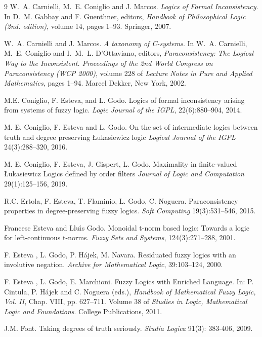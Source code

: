 \documentclass{article}
\theoremstyle{definition}
\begin{document}
\begin{thebibliography}{9}
 W.~A. Carnielli, M.~E. Coniglio and J. Marcos. {\em Logics of Formal Inconsistency}. In D.~M. Gabbay and F. Guenthner, editors, {\em Handbook of Philosophical Logic (2nd. edition)}, volume 14, pages 1--93. Springer, 2007.


W.~A. Carnielli and J. Marcos. {\em A taxonomy of {C}-systems}. In W.~A. Carnielli, M.~E. Coniglio and I.~M.~L. D'Ottaviano, editors,  {\em Paraconsistency: The Logical Way to the Inconsistent.
  Proceedings of the 2nd World Congress on Paraconsistency (WCP 2000)}, volume  228 of {\em Lecture Notes in Pure and Applied Mathematics}, pages 1--94. Marcel Dekker, New York, 2002.

M.E. Coniglio, F. Esteva, and L. Godo. Logics of formal inconsistency arising from systems of fuzzy logic. {\em Logic Journal of the IGPL}, 22(6):880--904, 2014.


  M. E. Coniglio, F. Esteva and L. Godo.
On the set of intermediate logics between truth and degree preserving {\L}ukasiewicz logic
 \emph{Logical Journal of the IGPL} 24(3):288--320, 2016.

 M. E. Coniglio, F. Esteva, J. Gispert, L. Godo.
Maximality in finite-valued {\L}ukasiewicz Logics defined by order filters
\emph{Journal of Logic and Computation} 29(1):125--156, 2019.

 R.C. Ertola, F. Esteva, T. Flaminio, L. Godo, C. Noguera.
Paraconsistency properties in degree-preserving fuzzy logics. {\em Soft Computing} 19(3):531--546, 2015.

Francesc Esteva and Llu{\'{\i}}s Godo.
Monoidal t-norm based logic: Towards a logic for left-continuous
  t-norms.
{\em Fuzzy Sets and Systems}, 124(3):271--288, 2001.

 F. Esteva , L. Godo, P. H\'{a}jek, M. Navara.
Residuated fuzzy logics with an involutive negation.
 \emph{Archive for Mathematical Logic}, 39:103--124, 2000.

 F. Esteva , L. Godo, E. Marchioni.
Fuzzy Logics with Enriched Language. In: P. Cintula, P. H\'ajek and C. Noguera (eds.), {\em Handbook of Mathematical Fuzzy Logic, Vol. II}, Chap. VIII, pp. 627--711. Volume 38 of {\em Studies in Logic, Mathematical Logic and Foundations}. College Publications, 2011.

 J.M. Font. Taking degrees of truth seriously. {\em Studia Logica} 91(3): 383-406, 2009.


\end{thebibliography}
\end{document}

